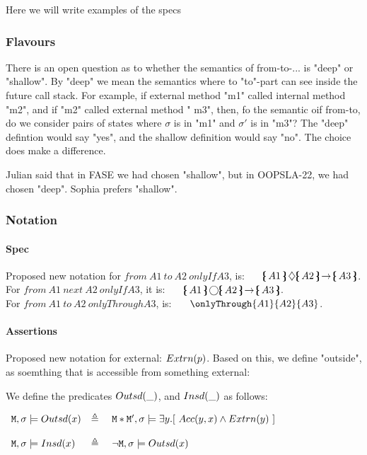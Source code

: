 Here we will write examples of the specs


\subsubsection{Flavours}

There is an open question as to whether the semantics of from-to-... is "deep" or "shallow". By "deep" we mean the semantics where to "to"-part can see inside the future call stack. For example, if external method "m1" called internal  method "m2", and if "m2" called external method " m3", then, fo the semantic oif from-to, do we consider pairs of states where $\sigma$ is in "m1" and $\sigma'$ is in "m3"?  The "deep" defintion would say "yes", and the shallow definition would say "no". The choice does make a difference.

Julian said that in FASE we had chosen "shallow", but in OOPSLA-22, we had chosen "deep". Sophia prefers "shallow".

\subsubsection{Notation}

\paragraph{Spec} Proposed new notation for $from\ A1\ to\  A2\ onlyIf A3$, is: \ \ \  $\onlyIf{A1} {A2} {A3}$. \\
For $from\ A1\ next\  A2\ onlyIf A3$, it is: \ \ \  $\onlyIfSingle{A1} {A2} {A3}$.
\\
For  $from\ A1\ to\  A2\ onlyThrough A3$, is:  \ \ \ $\onlyThrough{A1} {A2} {A3}$.

\paragraph{Assertions} Proposed new notation for external: $Extrn(p)$. Based on this, we define "outside", as soemthing that is accessible from something external:

\begin{definition}
We define the predicates $Outsd(\_)$, and $Insd(\_)$ as follows:

$\begin{array}{lll}
   \Mod, \sigma \models \outside{x} & \triangleq & \ \Mod*\Mod{'}, \sigma \models \exists y.[ \ \access{y} {x} \wedge \external {y}  \ ] 
  ~ \\
   \\
      \Mod, \sigma \models \inside{x} & \triangleq & \ \neg  \Mod, \sigma \models \outside{x} 
  \end{array}
$

\end{definition}

